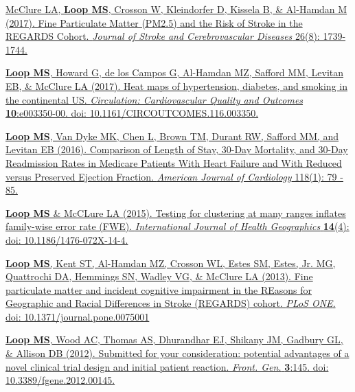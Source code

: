 \documentclass[10pt,letterpaper]{article}
\begin{document}
\begin{etaremune}
\item \href{https://www.sciencedirect.com/science/article/pii/S1052305717301568}{McClure LA, \textbf{Loop MS}, Crosson W, Kleindorfer D, Kissela B, \& Al-Hamdan M (2017). Fine Particulate Matter (PM2.5) and the Risk of Stroke in the REGARDS Cohort. \emph{Journal of Stroke and Cerebrovascular Diseases} 26(8): 1739-1744.}

\item \href{http://circoutcomes.ahajournals.org/content/10/1/e003350.full?ijkey=Tq0l4EAFSjOGzX7\&keytype=ref}{\textbf{Loop MS}, Howard G, de los Campos G, Al-Hamdan MZ, Safford MM, Levitan EB, \& McClure LA (2017). Heat maps of hypertension, diabetes, and smoking in the continental US. \emph{Circulation: Cardiovascular Quality and Outcomes} \textbf{10}:e003350-00. doi: 10.1161/CIRCOUTCOMES.116.003350.}

\item \href{http://www.sciencedirect.com/science/article/pii/S0002914916304969}{\textbf{Loop MS}, Van Dyke MK, Chen L, Brown TM, Durant RW, Safford MM, and Levitan EB (2016). Comparison of Length of Stay, 30-Day Mortality, and 30-Day Readmission Rates in Medicare Patients With Heart Failure and With Reduced versus Preserved Ejection Fraction. \emph{American Journal of Cardiology} 118(1): 79 - 85.}

\item \href{http://www.ij-healthgeographics.com/content/14/1/4}{\textbf{Loop MS} \& McCLure LA (2015). Testing for clustering at many ranges inflates family-wise error rate (FWE). \emph{International Journal of Health Geographics} \textbf{14}(4): doi: 10.1186/1476-072X-14-4.}

\item \href{http://www.plosone.org/article/info\%3Adoi\%2F10.1371\%2Fjournal.pone.0075001#references}{\textbf{Loop MS}, Kent ST, Al-Hamdan MZ, Crosson WL, Estes SM, Estes, Jr. MG, Quattrochi DA, Hemmings SN, Wadley VG, \& McClure LA (2013). Fine particulate matter and incident cognitive impairment in the REasons for Geographic and Racial Differences in Stroke (REGARDS) cohort. \emph{PLoS ONE}. doi: 10.1371/journal.pone.0075001}

\item \href{http://www.frontiersin.org/Pharmacogenetics_and_Pharmacogenomics/10.3389/fgene.2012.00145/abstract}{\textbf{Loop MS}, Wood AC, Thomas AS, Dhurandhar EJ, Shikany JM, Gadbury GL, \& Allison DB (2012). Submitted for your consideration: potential advantages of a novel clinical trial design and initial patient reaction. \emph{Front. Gen.} \textbf{3}:145. doi: 10.3389/fgene.2012.00145.}
\end{etaremune}
\end{document}
